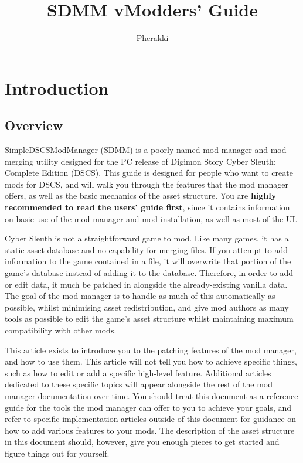 \documentclass{article}
\title{SDMM v\cymisversion\space Modders' Guide}
\author{Pherakki}
\date{}
\begin{document}
\thispagestyle{empty}
\maketitle
\tableofcontents
\clearpage
{} 
\section{Introduction}
\subsection{Overview}
SimpleDSCSModManager (SDMM) is a poorly-named mod manager and mod-merging utility designed for the PC release of Digimon Story Cyber Sleuth: Complete Edition (DSCS). This guide is designed for people who want to create mods for DSCS, and will walk you through the features that the mod manager offers, as well as the basic mechanics of the asset structure. You are \textbf{highly recommended to read the users' guide first}, since it contains information on basic use of the mod manager and mod installation, as well as most of the UI.

Cyber Sleuth is not a straightforward game to mod. Like many games, it has a static asset database and no capability for merging files. If you attempt to add information to the game contained in a file, it will overwrite that portion of the game's database instead of adding it to the database. Therefore, in order to add or edit data, it much be patched in alongside the already-existing vanilla data. The goal of the mod manager is to handle as much of this automatically as possible, whilst minimising asset redistribution, and give mod authors as many tools as possible to edit the game's asset structure whilst maintaining maximum compatibility with other mods.

This article exists to introduce you to the patching features of the mod manager, and how to use them. This article will not tell you how to achieve specific things, such as how to edit or add a specific high-level feature. Additional articles dedicated to these specific topics will appear alongside the rest of the mod manager documentation over time. You should treat this document as a reference guide for the tools the mod manager can offer to you to achieve your goals, and refer to specific implementation articles outside of this document for guidance on how to add various features to your mods. The description of the asset structure in this document should, however, give you enough pieces to get started and figure things out for yourself.
\end{document}
